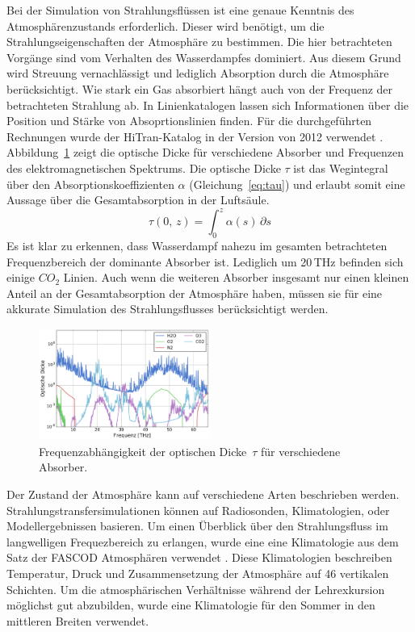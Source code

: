 \documentclass[10pt,a4paper,compsoc,peer review papers]{IEEEtran}
\begin{document}
Bei der Simulation von Strahlungsflüssen ist eine genaue Kenntnis des
Atmosphärenzustands erforderlich.  Dieser wird benötigt, um die
Strahlungseigenschaften der Atmosphäre zu bestimmen. Die hier betrachteten
Vorgänge sind vom Verhalten des Wasserdampfes dominiert. Aus diesem Grund wird
Streuung vernachlässigt und lediglich Absorption durch die Atmosphäre
berücksichtigt.  Wie stark ein Gas absorbiert hängt auch von der Frequenz der
betrachteten Strahlung ab. In Linienkatalogen lassen sich Informationen über
die Position und Stärke von Absoprtionslinien finden. Für die durchgeführten
Rechnungen wurde der HiTran-Katalog in der Version von 2012 verwendet
\cite{Rothman2013}.  Abbildung~\ref{fig:opacity} zeigt die optische Dicke für
verschiedene Absorber und Frequenzen des elektromagnetischen Spektrums.
Die optische Dicke $\tau$ ist das Wegintegral über den Absorptionskoeffizienten
$\alpha$ (Gleichung~\ref{eq:tau}) und erlaubt somit eine Aussage über die
Gesamtabsorption in der Luftsäule.
\begin{equation}\label{eq:tau}
\tau(0,\,z) = \int_0^z \alpha(s)\,\partial s
\end{equation}
Es ist klar zu erkennen, dass Wasserdampf nahezu im gesamten betrachteten
Frequenzbereich der dominante Absorber ist. Lediglich um 20\,THz befinden sich
einige $CO_2$ Linien. Auch wenn die weiteren Absorber insgesamt nur einen
kleinen Anteil an der Gesamtabsorption der Atmosphäre haben, müssen sie für
eine akkurate Simulation des Strahlungsflusses berücksichtigt werden.

\begin{figure}[ht]
  \centering
  \includegraphics[width=0.5\textwidth]{figures/midlatitude-summer_opacity.pdf}
  \caption{Frequenzabhängigkeit der optischen Dicke~$\tau$ für verschiedene
  Absorber.}
  \label{fig:opacity}
\end{figure}

Der Zustand der Atmosphäre kann auf verschiedene Arten beschrieben werden.
Strahlungstransfersimulationen können auf Radiosonden, Klimatologien,
oder Modellergebnissen basieren. Um einen Überblick über den Strahlungsfluss im
langwelligen Frequezbereich zu erlangen, wurde eine eine Klimatologie aus dem
Satz der FASCOD Atmosphären verwendet \cite{Anderson1986}. Diese Klimatologien
beschreiben Temperatur, Druck und Zusammensetzung der Atmosphäre auf 46
vertikalen Schichten. Um die atmosphärischen Verhältnisse während der
Lehrexkursion möglichst gut abzubilden, wurde eine Klimatologie für den Sommer
in den mittleren Breiten verwendet.
\end{document}
